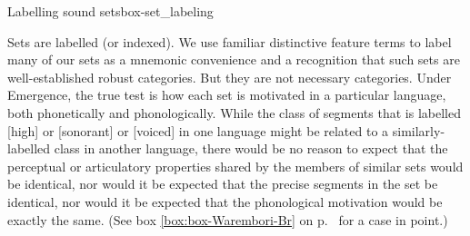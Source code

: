 \begin{dadpbox}{Labelling sound sets}{box-set_labeling}

Sets are labelled (or indexed). We use familiar distinctive feature terms to label many of our sets as a mnemonic convenience and a recognition that such sets are well-established robust categories. But they are not  necessary categories. Under Emergence, the true test is how each set is motivated in a particular language, both phonetically and phonologically. While the class of segments that is labelled [high] or [sonorant] or [voiced] in one language might be related to a similarly-labelled class in another language, there would be no reason to expect that the perceptual or articulatory properties shared by the members of similar sets would be identical, nor would it be expected that the precise segments in the set be identical, nor would it be expected that the phonological motivation would be exactly the same. (See  box {\ref{box:box-Warembori-Br}} on p.\ \pageref{box:box-Warembori-Br} for a case in point.)

\end{dadpbox}\label{page16}


